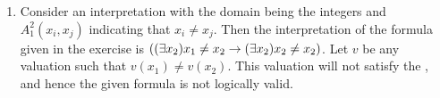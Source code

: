 \begin{enumerate}
\begin{enumerate}
      \item Consider an interpretation with the domain being the integers and \(A^2_1(x_i, x_j)\) indicating that \(x_i \neq x_j\). Then the interpretation of the formula given in the exercise is \(((\exists x_2)x_1 \neq x_2 \rightarrow (\exists x_2)x_2 \neq x_2)\). Let \(v\) be any valuation such that \(v(x_1) \neq v(x_2)\). This valuation will not satisfy the \wf{}, and hence the given formula is not logically valid.
    \end{enumerate}
\end{enumerate}
